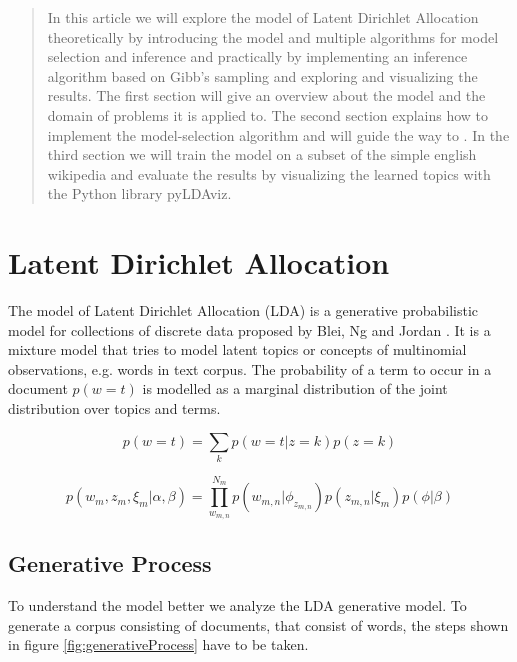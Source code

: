 \documentclass[12pt,landscape,twopage]{article}
\begin{document}
\begin{abstract}
 In this article we will explore the model of Latent Dirichlet Allocation theoretically by introducing the model and multiple algorithms for model selection and inference and practically by implementing an inference algorithm based on Gibb's sampling and exploring and visualizing the results.
 The first section will give an overview about the model and the domain of problems it is applied to.
 The second section explains how to implement the model-selection algorithm and will guide the way to  .
 In the third section we will train the model on a subset of the simple english wikipedia and evaluate the results by visualizing the learned topics with the Python library pyLDAviz.
\end{abstract}

\section{Latent Dirichlet Allocation}
The model of Latent Dirichlet Allocation (LDA) is a generative probabilistic model for collections of discrete data proposed by Blei, Ng and Jordan \cite{Blei2003}. It is a mixture model that tries to model latent topics or concepts of multinomial observations, e.g. words in text corpus.
The probability of a term to occur in a document \(p \left( w=t \right)\) is modelled as a marginal distribution of the joint distribution over topics and terms.

\begin{equation}
 p\left( w=t \right) = \sum\limits_{k} p\left( w=t \vert z=k \right) p\left( z=k \right)
\end{equation}

\begin{equation*}
 p\left( w_{m}, z_{m}, \xi_{m} \vert \alpha,\beta \right) = \prod\limits_{w_{m,n}}^{N_m} p \left(w_{m,n} \vert \phi_{z_{m,n}} \right) p \left(z_{m,n} \vert \xi_{m} \right) p \left( \phi \vert \beta \right)
\end{equation*}

\subsection{Generative Process}
To understand the model better we analyze the LDA generative model. To generate a corpus consisting of documents, that consist of words, the steps shown in figure \ref{fig:generativeProcess} have to be taken.
\end{document}
